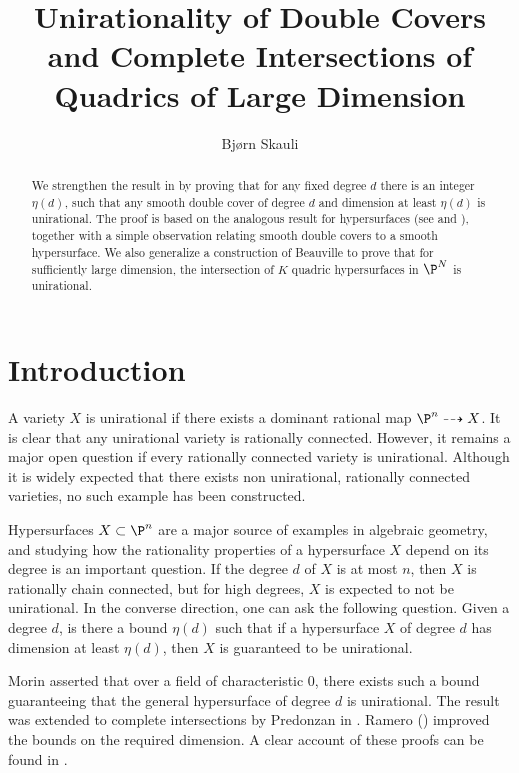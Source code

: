 
\title{Unirationality of Double Covers and Complete Intersections of Quadrics of Large Dimension} 
\author{Bjørn Skauli}
\date{}

	\maketitle
\label{pap:unirationality}
        \begin{abstract}
          We strengthen the result in \cite{CMMDoubleCover} by proving that for any fixed degree $d$ there is an integer $\eta(d)$, such that any smooth double cover of degree $d$ and dimension at least $\eta(d)$ is unirational. The proof is based on the analogous result for hypersurfaces (see \cite{HMP} and \cite{BRHypersurface}), together with a simple observation relating smooth double covers to a smooth hypersurface. We also generalize a construction of Beauville to prove that for sufficiently large dimension, the intersection of $K$ quadric hypersurfaces in $\P^N$ is unirational.
        \end{abstract}

	
	\section{Introduction}
	
	A variety $X$ is unirational if there exists a dominant rational map $\P^n \dashrightarrow X$. It is clear that any unirational variety is rationally connected. However, it remains a major open question if every rationally connected variety is unirational. Although it is widely expected that there exists non unirational, rationally connected varieties, no such example has been constructed.
	
Hypersurfaces $X \subset \P^n$ are a major source of examples in algebraic geometry, and studying how the rationality properties of a hypersurface $X$ depend on its degree is an important question. If the degree $d$ of $X$ is at most $n$, then $X$ is rationally chain connected, but for high degrees, $X$ is expected to not be unirational. In the converse direction, one can ask the following question. Given a degree $d$, is there a bound $\eta(d)$ such that if a hypersurface $X$ of degree $d$ has dimension at least $\eta(d)$, then $X$ is guaranteed to be unirational.

Morin \cite{Morin} asserted that over a field of characteristic $0$, there exists such a bound guaranteeing that the general hypersurface of degree $d$ is unirational. The result was extended to complete intersections by Predonzan in \cite{Predonzan}. Ramero (\cite{Ramero}) improved the bounds on the required dimension. A clear account of these proofs can be found in \cite{PS}.

